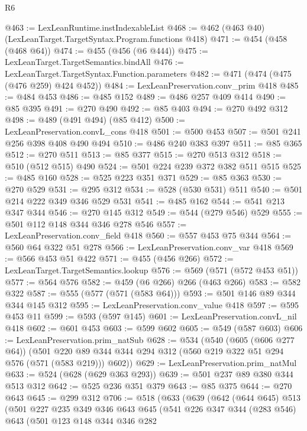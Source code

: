 \begin{lexlean}{R6}
\begin{coremodule}
@463 := LexLeanRuntime.instIndexableList
@468 := @462 (@463 @40) (LexLeanTarget.TargetSyntax.Program.functions @418)
@471 := @454 (@458 (@468 @64))
@474 := @455 (@456 (@6 @444))
@475 := LexLeanTarget.TargetSemantics.bindAll
@476 := LexLeanTarget.TargetSyntax.Function.parameters
@482 := @471 (@474 (@475 (@476 @259) @424 @452))
@484 := LexLeanPreservation.conv_prim @418
@485 := @484 @453
@486 := @485 @152
@489 := @486 @257 @409 @414
@490 := @85 @395
@491 := @270 @490
@492 := @85 @403
@494 := @270 @492 @312
@498 := @489 (@491 @494) (@85 @412)
@500 := LexLeanPreservation.convL_cons @418
@501 := @500 @453
@507 := @501 @241 @256 @398 @408 @490 @494
@510 := @486 @240 @383 @397
@511 := @85 @365
@512 := @270 @511
@513 := @85 @377
@515 := @270 @513 @312
@518 := @510 (@512 @515) @490
@524 := @501 @224 @239 @372 @382 @511 @515
@525 := @485 @160
@528 := @525 @223 @351 @371
@529 := @85 @363
@530 := @270 @529
@531 := @295 @312
@534 := @528 (@530 @531) @511
@540 := @501 @214 @222 @349 @346 @529 @531
@541 := @485 @162
@544 := @541 @213 @347 @344
@546 := @270 @145 @312
@549 := @544 (@279 @546) @529
@555 := @501 @112 @148 @344 @346 @278 @546
@557 := LexLeanPreservation.conv_field @418
@560 := @557 @453 @75 @344
@564 := @560 @64 @322 @51 @278
@566 := LexLeanPreservation.conv_var @418
@569 := @566 @453 @51 @422
@571 := @455 (@456 @266)
@572 := LexLeanTarget.TargetSemantics.lookup
@576 := @569 (@571 (@572 @453 @51))
@577 := @564 @576
@582 := @459 (@6 @266) @266 (@463 @266)
@583 := @582 @322
@587 := @555 (@577 (@571 (@583 @64)))
@593 := @501 @146 @89 @344 @344 @145 @312
@595 := LexLeanPreservation.conv_value @418
@597 := @595 @453 @11
@599 := @593 (@597 @145)
@601 := LexLeanPreservation.convL_nil @418
@602 := @601 @453
@603 := @599 @602
@605 := @549 (@587 @603)
@606 := LexLeanPreservation.prim_natSub
@628 := @534
    (@540
      (@605 (@606 @277 @64))
      (@501 @220 @89 @344 @344 @294 @312 (@560 @219 @322 @51 @294 @576 (@571 (@583 @219))) @602))
@629 := LexLeanPreservation.prim_natMul
@633 := @524 (@628 (@629 @363 @293))
@639 := @501 @237 @89 @380 @344 @513 @312
@642 := @525 @236 @351 @379
@643 := @85 @375
@644 := @270 @643
@645 := @299 @312
@706 := @518
    (@633
      (@639
        (@642
          (@644 @645)
          @513
          (@501
            @227
            @235
            @349
            @346
            @643
            @645
            (@541
              @226
              @347
              @344
              (@283 @546)
              @643
              (@501
                @123
                @148
                @344
                @346
                @282

\end{coremodule}
\end{lexlean}

